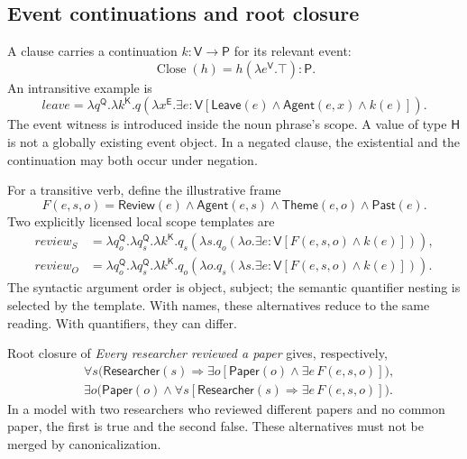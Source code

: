 \documentclass[11pt,a4paper]{article}
\newcommand{\E}{\mathsf{E}}
\newcommand{\V}{\mathsf{V}}
\newcommand{\Prop}{\mathsf{P}}
\newcommand{\Q}{\mathsf{Q}}
\newcommand{\HH}{\mathsf{H}}
\newcommand{\KK}{\mathsf{K}}
\newcommand{\Close}{\operatorname{Close}}
\begin{document}
\subsection{Event continuations and root closure}
A clause carries a continuation \(k:\V\to\Prop\) for its relevant event:
\begin{equation}
  \Close(h)=h(\lambda e^{\V}.\top):\Prop.
  \label{eq:close}
\end{equation}
An intransitive example is
\begin{equation}
 \mathit{leave}
 =\lambda q^{\Q}.\lambda k^{\KK}.
   q\!\left(\lambda x^{\E}.
    \exists e{:}\V[
      \mathsf{Leave}(e)\land\mathsf{Agent}(e,x)\land k(e)]\right).
 \label{eq:leave}
\end{equation}
The event witness is introduced inside the noun phrase's scope. A value of
type \(\HH\) is not a globally existing event object. In a negated clause,
the existential and the continuation may both occur under negation.

For a transitive verb, define the illustrative frame
\[
 F(e,s,o)=
 \mathsf{Review}(e)\land\mathsf{Agent}(e,s)\land
 \mathsf{Theme}(e,o)\land\mathsf{Past}(e).
\]
Two explicitly licensed local scope templates are
\begin{align}
 \mathit{review}_{S}
 &=\lambda q_o^{\Q}.\lambda q_s^{\Q}.\lambda k^{\KK}.
 q_s\!\left(\lambda s.
 q_o\!\left(\lambda o.\exists e{:}\V[F(e,s,o)\land k(e)]\right)\right),
 \label{eq:tvsubj}\\
 \mathit{review}_{O}
 &=\lambda q_o^{\Q}.\lambda q_s^{\Q}.\lambda k^{\KK}.
 q_o\!\left(\lambda o.
 q_s\!\left(\lambda s.\exists e{:}\V[F(e,s,o)\land k(e)]\right)\right).
 \label{eq:tvobj}
\end{align}
The syntactic argument order is object, subject; the semantic quantifier
nesting is selected by the template. With names, these alternatives reduce
to the same reading. With quantifiers, they can differ.

Root closure of \emph{Every researcher reviewed a paper} gives, respectively,
\begin{align}
 &\forall s\bigl(\mathsf{Researcher}(s)\Rightarrow
       \exists o[\mathsf{Paper}(o)\land\exists e\,F(e,s,o)]\bigr),
       \label{eq:scopeone}\\
 &\exists o\bigl(\mathsf{Paper}(o)\land
       \forall s[\mathsf{Researcher}(s)\Rightarrow
                      \exists e\,F(e,s,o)]\bigr).
       \label{eq:scopetwo}
\end{align}
In a model with two researchers who reviewed different papers and no common
paper, the first is true and the second false. These alternatives must not be
merged by canonicalization.
\end{document}
